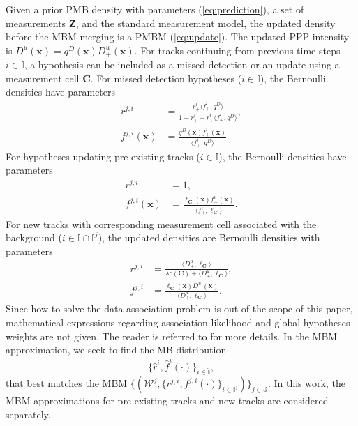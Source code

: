 \documentclass[conference]{IEEEtran}
\begin{document}
Given a prior PMB density with parameters (\ref{eq:prediction}), a set of measurements $\mathbf{Z}$, and the standard measurement model, the updated density before the MBM merging is a PMBM (\ref{eq:update}). The updated PPP intensity is $D^u(\mathbf{x}) = q^D(\mathbf{x})D_+^u(\mathbf{x})$. For tracks continuing from previous time steps $i\in\mathbb{I}$, a hypothesis can be included as a missed detection or an update using a measurement cell $\mathbf{C}$. For missed detection hypotheses ($i\in\mathbb{I}$), the Bernoulli densities have parameters
\begin{subequations}
\begin{align}
    r^{j,i} &= \frac{r^i_+\langle f_+^i,q^D\rangle}{1-r_+^i+r^i_+\langle f_+^i,q^D\rangle},\\
    f^{j,i}(\mathbf{x}) &= \frac{q^D(\mathbf{x})f^i_+(\mathbf{x})}{\langle f^i_+,q^D\rangle}.
\end{align}
\end{subequations}
For hypotheses updating pre-existing tracks ($i\in\mathbb{I}$), the Bernoulli densities have parameters
\begin{subequations}
\begin{align}
    r^{j,i} &= 1,\\
    f^{j,i}(\mathbf{x}) &= \frac{\ell_{\mathbf{C}}(\mathbf{x})f^i_+(\mathbf{x})}{\langle f^i_+,\ell_{\mathbf{C}}\rangle}.
\end{align}
\end{subequations}
For new tracks with corresponding measurement cell associated with the background ($i\in\mathbb{I}\cap\mathbb{I}^j$), the updated densities are Bernoulli densities with parameters
\begin{subequations}
\begin{align}
    r^{j,i} &= \frac{\langle D^u_+,\ell_{\mathbf{C}}\rangle}{\lambda c(\mathbf{C})+\langle D^u_+,\ell_{\mathbf{C}}\rangle},\\
    f^{j,i} &= \frac{\ell_{\mathbf{C}}(\mathbf{x})D^u_+(\mathbf{x})}{\langle D^u_+,\ell_{\mathbf{C}}\rangle}.
\end{align}
\end{subequations}
Since how to solve the data association problem is out of the scope of this paper, mathematical expressions regarding association likelihood and global hypotheses weights are not given. The reader is referred to \cite{pmbmextended2} for more details. In the MBM approximation, we seek to find the MB distribution
\begin{equation}
\{\hat{r}^i,\hat{f}^i(\cdot)\}_{i\in\hat{\mathbb{I}}},
\end{equation}
that best matches the MBM $\{(\mathcal{W}^j,\{r^{j,i},f^{j,i}(\cdot)\}_{i\in\mathbb{I}^j})\}_{j\in\mathbb{J}}$. In this work, the MBM approximations for pre-existing tracks and new tracks are considered separately. 
\end{document}
